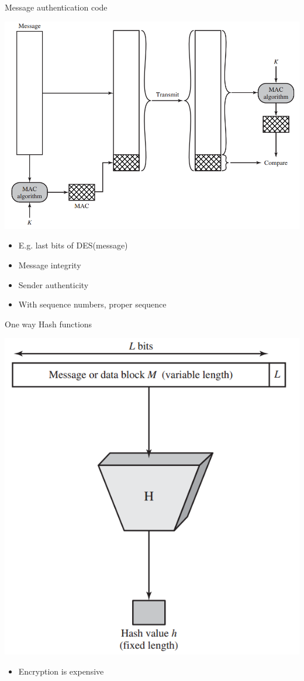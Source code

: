 \documentclass{beamer}
\begin{document}
\begin{frame}{Message authentication code}
  \begin{center}
    \includegraphics[width=0.6\linewidth]{MAC}
  \end{center}
  \begin{itemize}
\item E.g. last bits of DES(message)
\item Message integrity
\item Sender authenticity
\item With sequence numbers, proper sequence
  \end{itemize}
\end{frame}

\begin{frame}{One way Hash functions}
  \begin{center}
    \includegraphics[width=0.5\linewidth]{HASH}
  \end{center}
  \begin{itemize}
\item Encryption is expensive
  \end{itemize}
\end{frame}
\end{document}
